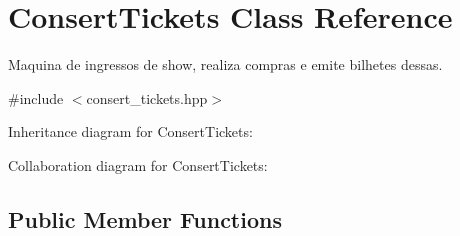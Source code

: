 \hypertarget{class_consert_tickets}{}\section{Consert\+Tickets Class Reference}
\label{class_consert_tickets}


Maquina de ingressos de show, realiza compras e emite bilhetes dessas.  




{\ttfamily \#include $<$consert\+\_\+tickets.\+hpp$>$}



Inheritance diagram for Consert\+Tickets\+:


Collaboration diagram for Consert\+Tickets\+:
\subsection*{Public Member Functions}
